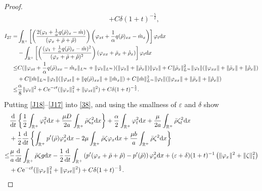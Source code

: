\documentclass[11pt]{article}
\theoremstyle{plain}
\numberwithin{equation}{section}
\begin{document}
\begin{proof}
\begin{align}
			&+C\delta(1+t)^{-\frac{5}{2}},
		\end{align}
		\begin{align}\label{J17}
			I_{27}
			=&\int_{\mathbb{R}^+}\left[\left(\frac{2(\varphi_t+\frac{1}{\alpha}q(\bar\rho)_x-\hat m)}{(\varphi_x+\bar\rho+\hat\rho)}\right)\left(\varphi_{xt}+\frac{1}{\alpha}q(\bar\rho)_{xx}-\hat m_x\right)\right]\varphi_t{\rm d}x\notag\\
			&-\int_{\mathbb{R}^+}\left[\left(\frac{(\varphi_t+\frac{1}{\alpha}q(\bar\rho)_x-\hat m)^2}{(\varphi_x+\bar\rho+\hat\rho)^2}\right)(\varphi_{xx}+\bar\rho_x+\hat\rho_x	)\right]\varphi_t{\rm d}x\notag\\
			\leq& C(\|\varphi_{xt}+\frac{1}{\alpha}q(\bar\rho)_{xx}-\hat m_x\|_{L^\infty}+\|\varphi_t\|_{L^\infty})(\|\varphi_t\|+\|\bar\rho_x\|)\|\varphi_t\|+C\|\bar\rho_x\|^2_{L^\infty}\|\varphi_t\|(\|\varphi_{xx}\|+\|\bar\rho_{x}\|+\|\hat \rho_x\|)\notag\\
			&+C\|\hat m\|_{L^\infty}\|\varphi_t\|(\|\varphi_{xt}\|+\|q(\bar\rho)_{xx}\|+\|\hat m_x\|)+C\|\hat m\|^2_{L^\infty}\|\varphi_t\|(\|\varphi_{xx}\|+\|\bar\rho_{x}\|+\|\hat \rho_x\|)\notag\\
			\leq& \frac{\alpha}{8}\|\varphi_t\|^2+C{\rm e}^{-ct}(\|\varphi_{x}\|_1^2+\|\varphi_{xt}\|^2)+C\delta(1+t)^{-\frac{5}{2}}.
		\end{align}
	Putting \eqref{J18}--\eqref{J17} into \eqref{38}, and using the smallness of $\varepsilon$ and $\delta$ show	
\begin{align}\label{13.43}
			&\frac{{\rm d}}{{\rm d}t}\left\{\frac{1}{2}\int_{\mathbb{R}^+}\varphi_t^2{\rm d}x	+\frac{\mu D}{2a}\int_{\mathbb{R}^+}^{}\bar\rho\zeta_x^2{\rm d}x\right\}+\frac{\alpha}{2}\int_{\mathbb{R}^+}\varphi_t^2{\rm d}x+\frac{\mu}{2a}\int_{\mathbb{R}^+}^{}\bar\rho\zeta_t^2{\rm d}x\notag\\
			&+\frac{1}{2}	\frac{{\rm d}}{{\rm d}t}\left\{\int_{\mathbb{R}^+}p^{\prime}(\bar\rho)\varphi_x^2{\rm d}x-2\mu\int_{\mathbb{R}^+}\bar\rho\zeta\varphi_x{\rm d}x+\frac{\mu b}{a}\int_{\mathbb{R}^+}^{}\bar\rho\zeta^2{\rm d}x\right\}\notag\\
			\leq &\frac{\mu}{a}\frac{{\rm d}}{{\rm d}t}\int_{\mathbb{R}^+}\bar\rho\zeta g{\rm d}x-\frac{1}{2}	\frac{{\rm d}}{{\rm d}t}\int_{\mathbb{R}^+}\left(p^{\prime}(\varphi_x+\bar\rho+\hat\rho)-p^{\prime}(\bar\rho)\right)\varphi_x^2{\rm d}x+(\varepsilon+\delta)(1+t)^{-1}\left(\|\varphi_x\|^2+\|\zeta\|_1^2\right)\notag\\ 
			&+C{\rm e}^{-ct}(\|\varphi_{x}\|_1^2+\|\varphi_{xt}\|^2)+C\delta(1+t)^{-\frac{5}{2}}.

\end{align}
\end{proof}
\end{document}
